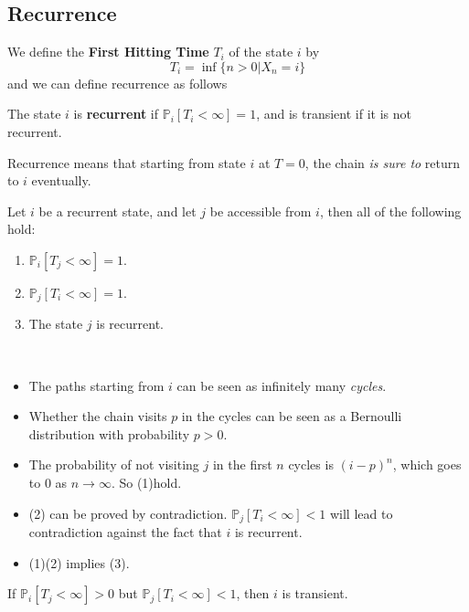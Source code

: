 \subsection{Recurrence}
We define the \textbf{First Hitting Time} $T_i$ of the state $i$ by
\[ T_i = \inf\{n>0 | X_n = i\} \]
and we can define recurrence as follows
\begin{definition}[Recurrence]
    The state $i$ is \textbf{recurrent} if $\mathbb{P}_i[T_i<\infty] = 1$, and is transient if it is not recurrent.
\end{definition}
\begin{remark}
    Recurrence means that starting from state $i$ at $T=0$, the chain \emph{is sure to} return to $i$ eventually.
\end{remark}
\begin{theorem}
    \normalfont
    Let $i$ be a recurrent state, and let $j$ be accessible from $i$, then all of the following hold:
    \begin{enumerate}
        \item $\mathbb{P}_i[T_j < \infty] = 1$.
        \item $\mathbb{P}_j[T_i < \infty] = 1$.
        \item The state $j$ is recurrent.
    \end{enumerate}
\end{theorem}
\begin{sketchproof}
    ~{}
    \begin{itemize}
        \item The paths starting from $i$ can be seen as infinitely many \emph{cycles}.
        \item Whether the chain visits $p$ in the cycles can be seen as a Bernoulli distribution with probability $p>0$.
        \item The probability of not visiting $j$ in the first $n$ cycles is $(i-p)^n$, which goes to $0$ as $n\to\infty$. So (1)hold.
        \item (2) can be proved by contradiction. $\mathbb{P}_j[T_i < \infty] < 1$ will lead to contradiction against the fact that $i$ is recurrent.
        \item (1)(2) implies (3).
    \end{itemize}
\end{sketchproof}
\begin{corollary}
    If $\mathbb{P}_i[T_j < \infty] > 0$ but $\mathbb{P}_j[T_i < \infty] < 1$, then $i$ is transient.
\end{corollary}
